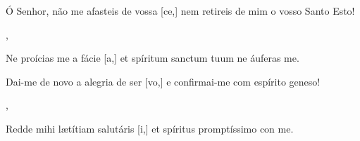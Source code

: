 {    {\item {}Ó Senhor, não me afasteis de vossa [ce,] nem retireis de mim o vosso Santo Esto!~\Responsorium},
  {\item {}Ne proícias me a fácie [a,] et spíritum sanctum tuum ne áuferas  me.~\Responsorium}%
    {\item {}Dai-me de novo a alegria de ser [vo,] e confirmai-me com espírito geneso!~\Responsorium},
  {\item {}Redde mihi lætítiam salutáris [i,] et spíritus promptíssimo con me.~\Responsorium}%
    {~\Responsorium}
}